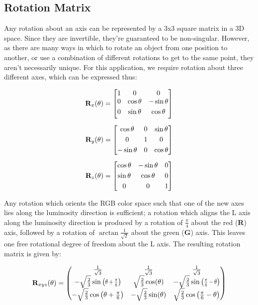 \subsection{Rotation Matrix}\label{sec:RotationMatrix}
Any rotation about an axis can be represented by a 3x3 square matrix in a 3D space. Since they are invertible, they're guaranteed to be non-singular. However, as there are many ways in which to rotate an object from one position to another, or use a combination of different rotations to get to the same point, they aren't necessarily unique. For this application, we require rotation about three different axes, which can be expressed thus:


\begin{alignat}{1}
\R_x(\theta) &= \begin{bmatrix}
1 & 0 & 0 \\
0 & \cos \theta &  -\sin \theta \\[3pt]
0 & \sin \theta  &  \cos \theta \\[3pt]
\end{bmatrix} \\[6pt]
\R_y(\theta) &= \begin{bmatrix}
\cos \theta & 0 & \sin \theta \\[3pt]
0 & 1 & 0 \\[3pt]
-\sin \theta & 0 & \cos \theta \\
\end{bmatrix} \\[6pt]
\R_z(\theta) &= \begin{bmatrix}
\cos \theta &  -\sin \theta & 0 \\[3pt]
\sin \theta & \cos \theta & 0\\[3pt]
0 & 0 & 1\\
\end{bmatrix}
\end{alignat}


Any rotation which orients the RGB color space such that one of the new axes lies along the luminosity direction is sufficient; a rotation which aligns the L axis along the luminosity direction is produced by a rotation of $\frac{\pi}4$ about the red (\textbf{R}) axis, followed by a rotation of $\arctan{\frac{1}{\sqrt{2}}}$ about the green (\textbf{G}) axis. This leaves one free rotational degree of freedom about the L axis. The resulting rotation matrix is given by:

\begin{equation}
\R_{xyz}(\theta) =
\begin{pmatrix}
 \frac{1}{\sqrt{3}} & \frac{1}{\sqrt{3}} & \frac{1}{\sqrt{3}} \\
 -\sqrt{\frac{2}{3}} \sine{\theta +\Pii{6} } & \sqrt{\frac{2}{3}} \cos (\theta ) & -\sqrt{\frac{2}{3}} \sine{\Pii{6}-\theta } \\
 -\sqrt{\frac{2}{3}} \cos \left(\theta +\Pii{6}\right) & -\sqrt{\frac{2}{3}} \sin (\theta ) & \sqrt{\frac{2}{3}} \cos \left(\Pii{6}-\theta \right) \\
\end{pmatrix}
\end{equation}


